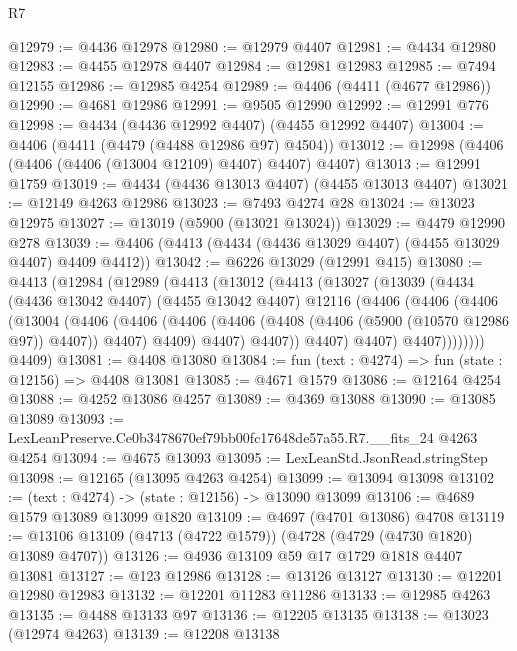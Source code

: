 \begin{lexlean}{R7}
\begin{coremodule}
@12979 := @4436 @12978
@12980 := @12979 @4407
@12981 := @4434 @12980
@12983 := @4455 @12978 @4407
@12984 := @12981 @12983
@12985 := @7494 @12155
@12986 := @12985 @4254
@12989 := @4406 (@4411 (@4677 @12986))
@12990 := @4681 @12986
@12991 := @9505 @12990
@12992 := @12991 @776
@12998 := @4434 (@4436 @12992 @4407) (@4455 @12992 @4407)
@13004 := @4406 (@4411 (@4479 (@4488 @12986 @97) @4504))
@13012 := @12998 (@4406 (@4406 (@4406 (@13004 @12109) @4407) @4407) @4407)
@13013 := @12991 @1759
@13019 := @4434 (@4436 @13013 @4407) (@4455 @13013 @4407)
@13021 := @12149 @4263 @12986
@13023 := @7493 @4274 @28
@13024 := @13023 @12975
@13027 := @13019 (@5900 (@13021 @13024))
@13029 := @4479 @12990 @278
@13039 := @4406 (@4413 (@4434 (@4436 @13029 @4407) (@4455 @13029 @4407) @4409 @4412))
@13042 := @6226 @13029 (@12991 @415)
@13080 := @4413
    (@12984
      (@12989
        (@4413
          (@13012
            (@4413
              (@13027
                (@13039
                  (@4434
                    (@4436 @13042 @4407)
                    (@4455 @13042 @4407)
                    @12116
                    (@4406
                      (@4406
                        (@4406
                          (@13004
                            (@4406
                              (@4406
                                (@4406
                                  (@4406 (@4408 (@4406 (@5900 (@10570 @12986 @97)) @4407)) @4407)
                                  @4409)
                                @4407)
                              @4407))
                          @4407)
                        @4407)
                      @4407))))))))
      @4409)
@13081 := @4408 @13080
@13084 := fun (text : @4274) => fun (state : @12156) => @4408 @13081
@13085 := @4671 @1579
@13086 := @12164 @4254
@13088 := @4252 @13086 @4257
@13089 := @4369 @13088
@13090 := @13085 @13089
@13093 := LexLeanPreserve.Ce0b3478670ef79bb00fc17648de57a55.R7.__fits_24 @4263 @4254
@13094 := @4675 @13093
@13095 := LexLeanStd.JsonRead.stringStep
@13098 := @12165 (@13095 @4263 @4254)
@13099 := @13094 @13098
@13102 := (text : @4274) -> (state : @12156) -> @13090 @13099
@13106 := @4689 @1579 @13089 @13099 @1820
@13109 := @4697 (@4701 @13086) @4708
@13119 := @13106 @13109 (@4713 (@4722 @1579)) (@4728 (@4729 (@4730 @1820) @13089 @4707))
@13126 := @4936 @13109 @59 @17 @1729 @1818 @4407 @13081
@13127 := @123 @12986
@13128 := @13126 @13127
@13130 := @12201 @12980 @12983
@13132 := @12201 @11283 @11286
@13133 := @12985 @4263
@13135 := @4488 @13133 @97
@13136 := @12205 @13135
@13138 := @13023 (@12974 @4263)
@13139 := @12208 @13138

\end{coremodule}
\end{lexlean}
